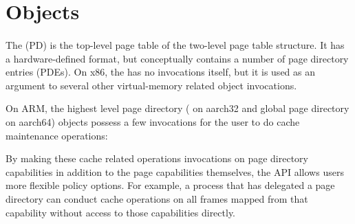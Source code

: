 \section{Objects}

\paragraph{}

The  (PD) is the top-level page table of the 
two-level page table structure. It has a hardware-defined format, but
conceptually contains a number of page directory entries (PDEs).
On x86, the  has no invocations itself, but it is used
as an argument to several other virtual-memory related object invocations.

On ARM, the highest level page directory ( on aarch32 and global page directory on
aarch64) objects possess a few invocations for the user to do cache maintenance
operations:

\begin{description}
    \item[]
    \item[]
    \item[]
    \item[]

    \item[]
    \item[]
    \item[]
    \item[]
\end{description}

By making these cache related operations invocations on page directory capabilities in addition to
the page capabilities themselves, the
API allows users more flexible policy options. For example, a process that has delegated a page
directory can conduct cache operations on all frames mapped from that capability without access
to those capabilities directly.


